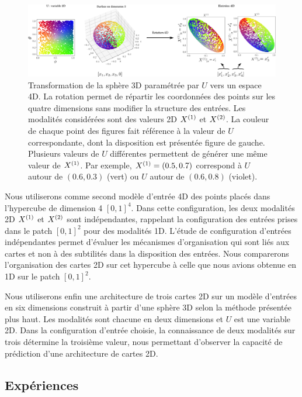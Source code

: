 \documentclass[../main]{subfiles}
\begin{document}
\begin{figure}
	\includegraphics[width=\textwidth]{sphere_inputs_colormap.png}
	\caption{Transformation de la sphère 3D paramétrée par $U$ vers un espace 4D. La rotation permet de répartir les coordonnées des points sur les quatre dimensions sans modifier la structure des entrées. Les modalités considérées sont des valeurs 2D $X^{({1})}$ et $X^{({2})}$.
	La couleur de chaque point des figures fait référence à la valeur de $U$ correspondante, dont la disposition est présentée figure de gauche. Plusieurs valeurs de $U$ différentes permettent de générer une même valeur de $X^{({1})}$. Par exemple, $X^{({1})} = (0.5, 0.7)$ correspond à $U$ autour de $(0.6,0.3)$ (vert) ou $U$ autour de $ (0.6,0.8)$ (violet).
	\label{fig:sphere_inputs}}
\end{figure}

Nous utiliserons comme second modèle d'entrée 4D des points placés dans l'hypercube de dimension 4 $[0,1]^4$. Dans cette configuration, les deux modalités 2D $X^{({1})}$ et $X^{({2})}$ sont indépendantes, rappelant la configuration des entrées prises dans le patch $[0,1]^2$ pour des modalités 1D. L'étude de configuration d'entrées indépendantes permet d'évaluer les mécanismes d'organisation qui sont liés aux cartes et non à des subtilités dans la disposition des entrées.
Nous comparerons l'organisation des cartes 2D sur cet hypercube à celle que nous avions obtenue en 1D sur le patch $[0,1]^2$. 

Nous utiliserons enfin une architecture de trois cartes 2D sur un modèle d'entrées en six dimensions construit à partir d'une sphère 3D selon la méthode présentée plus haut. 
Les modalités sont chacune en deux dimensions et $U$ est une variable 2D.
Dans la configuration d'entrée choisie, la connaissance de deux modalités sur trois détermine la troisième valeur, nous permettant d'observer la capacité de prédiction d'une architecture de cartes 2D.

\subsection{Expériences}
\end{document}
